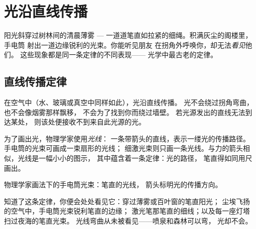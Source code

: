\chapter{光沿直线传播}\label{ch:g4:light-straight-lines}

阳光斜穿过树林间的清晨薄雾 ---
一道道笔直如拉紧的细绳。积满灰尘的阁楼里，手电筒
射出一道边缘锐利的光束。你能听见朋友
在拐角外呼唤你，却无法\emph{看见}他们。
这些现象都是同一条定律的不同表现——
光学中最古老的定律。

\section{直线传播定律}

\begin{proposition}[光沿直线传播]\label{prop:g4:light-straight-lines:law}
在空气中（水、玻璃或真空中同样如此），光沿直线传播。
光不会绕过拐角弯曲，也不会像烟雾那样飘移，
不会为了找到你而绕过墙壁。
若光源发出的直线无法到达某处，
则该处便接收不到来自此光源的光。
\end{proposition}

\begin{definition}[光线]\label{def:g4:light-straight-lines:ray}
为了画出光，物理学家使用\emph{光线}：
一条带箭头的直线，表示一缕光的传播路径。
手电筒的光束可画成一束扇形的光线；
细激光束则只画一条光线。与力的箭头相似，光线是一幅小小的图示，
其中蕴含着一条定律：光的路径，
笔直得如同用尺画出。
\end{definition}

\begin{omfigure}

{\small 物理学家画法下的手电筒光束：笔直的光线，
箭头标明光的传播方向。}
\end{omfigure}

\begin{example}[定律的表现]\label{ex:g4:light-straight-lines:sightings}
知道了这条定律，你便会处处看见它：穿过薄雾或百叶窗的笔直阳光；
尘埃飞扬的空气中，手电筒光束锐利笔直的边缘；
激光笔那笔直的细线；以及每一座灯塔
扫过夜海的笔直光束。
光线弯曲从未被看见——喷泉和森林可以弯，
光却不会。
\end{example}

